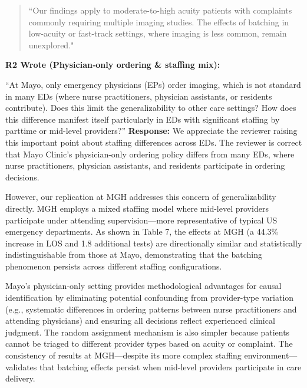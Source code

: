 \documentclass[11pt]{article}
\newenvironment{quote2}
{ \bigskip
\noindent
         \small\em
         \baselineskip=14pt
}
\newcommand{\1}{\hbox{\rm 1\kern-.35em 1}}
\begin{document}
\begin{quote}
``Our findings apply to moderate-to-high acuity patients with complaints commonly requiring multiple imaging studies. The effects of batching in low-acuity or fast-track settings, where imaging is less common, remain unexplored."
\end{quote}


\color{black}

\begin{quote2}
\textbf{R2 Wrote (Physician‑only ordering \& staffing mix):}  

\noindent``At Mayo, only emergency physicians (EPs) order imaging, which is not standard in many EDs (where nurse practitioners, physician assistants, or residents contribute). Does this limit the generalizability to other care settings? How does this difference manifest itself particularly in EDs with significant staffing by parttime or mid-level providers?” 
\end{quote2}

\noindent\textbf{Response:} \color{blue}We appreciate the reviewer raising this important point about staffing differences across EDs. The reviewer is correct that Mayo Clinic's physician-only ordering policy differs from many EDs, where nurse practitioners, physician assistants, and residents participate in ordering decisions.

However, our replication at MGH addresses this concern of generalizability directly. MGH employs a mixed staffing model where mid-level providers participate under attending supervision—more representative of typical US emergency departments. As shown in Table 7, the effects at MGH (a 44.3\% increase in LOS and 1.8 additional tests) are directionally similar and statistically indistinguishable from those at Mayo, demonstrating that the batching phenomenon persists across different staffing configurations.

Mayo's physician-only setting provides methodological advantages for causal identification by eliminating potential confounding from provider-type variation (e.g., systematic differences in ordering patterns between nurse practitioners and attending physicians) and ensuring all decisions reflect experienced clinical judgment. The random assignment mechanism is also simpler because patients cannot be triaged to different provider types based on acuity or complaint. The consistency of results at MGH—despite its more complex staffing environment—validates that batching effects persist when mid-level providers participate in care delivery.
\end{document}
